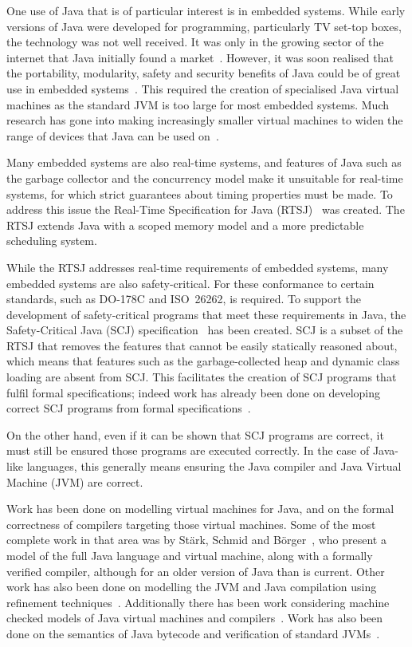 \documentclass[a4paper,10pt]{report}
\begin{document}
One use of Java that is of particular interest is in embedded systems.
While early versions of Java were developed for programming,
particularly TV set-top boxes, the technology was not well received.
It was only in the growing sector of the internet that Java initially
found a market~\cite{horstmann2002}.
However, it was soon realised that the portability, modularity, safety
and security benefits of Java could be of great use in embedded
systems~\cite{mulchandani1998}.
This required the creation of specialised Java virtual machines as the
standard JVM is too large for most embedded systems.
Much research has gone into making increasingly smaller virtual
machines to widen the range of devices that Java can be used
on~\cite{caska2011,thomm2010}.

Many embedded systems are also real-time systems, and features of Java
such as the garbage collector and the concurrency model make it
unsuitable for real-time systems, for which strict guarantees about
timing properties must be made.
To address this issue the Real-Time Specification for Java
(RTSJ)~\cite{gosling2000} was created.
The RTSJ extends Java with a scoped memory model and a more
predictable scheduling system.

While the RTSJ addresses real-time requirements of embedded systems,
many embedded systems are also safety-critical.
For these conformance to certain standards, such as \mbox{DO-178C} and
ISO~26262, is required.
To support the development of safety-critical programs that meet these
requirements in Java, the Safety-Critical Java (SCJ)
specification~\cite{locke2013} has been created.
SCJ is a subset of the RTSJ that removes the features that cannot be
easily statically reasoned about, which means that features such as
the garbage-collected heap and dynamic class loading are absent from
SCJ.
This facilitates the creation of SCJ programs that fulfil formal
specifications; indeed work has already been done on developing
correct SCJ programs from formal specifications~\cite{cavalcanti2011,
  cavalcanti2013}.

On the other hand, even if it can be shown that SCJ programs are
correct, it must still be ensured those programs are executed
correctly.
In the case of Java-like languages, this generally means ensuring the
Java compiler and Java Virtual Machine (JVM) are correct.

Work has been done on modelling virtual machines for Java, and on the
formal correctness of compilers targeting those virtual machines.
Some of the most complete work in that area was by St\"{a}rk, Schmid
and B\"{o}rger~\cite{stark2001}, who present a model of the full Java
language and virtual machine, along with a formally verified compiler,
although for an older version of Java than is current.
Other work has also been done on modelling the JVM and Java
compilation using refinement techniques~\cite{duran2010}.
Additionally there has been work considering machine checked models of
Java virtual machines and compilers~\cite{lochbihler2012, nipkow2000,
  strecker2002}.
Work has also been done on the semantics of Java bytecode and
verification of standard JVMs~\cite{bertelsen2000, jones1998}.
\end{document}
